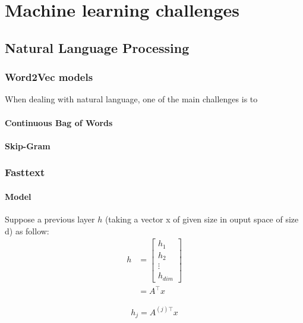 \chapter{Machine learning challenges}
\label{cha:results}




\section{Natural Language Processing}
\subsection{Word2Vec models}

When dealing with natural language, one of the main challenges is to  
\subsubsection*{Continuous Bag of Words}
\subsubsection*{Skip-Gram}

\subsection{Fasttext}

\subsubsection{Model}
Suppose a previous layer $h$ (taking a vector x of given size in ouput space of size d) as follow:
\begin{align}
	h 
	&= 
	\begin{bmatrix} 
		h_1 \\
		h_2 \\
		\vdots \\
		h_{\textit{dim}}
	\end{bmatrix}\\
	&= A^{\top}x
\end{align}


\begin{align}
	h_j = A^{(j)\top}x
\end{align}

